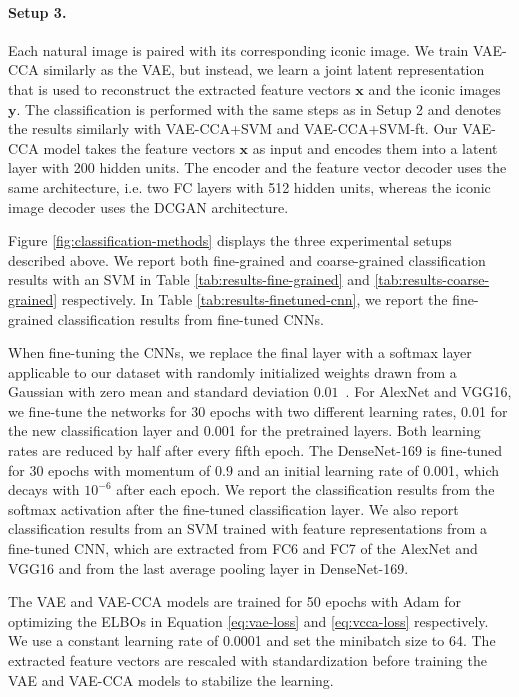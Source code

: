 \paragraph*{Setup 3.} Each natural image is paired with its corresponding iconic image. We train VAE-CCA similarly as the VAE, but instead, we learn a joint latent representation that is used to reconstruct the extracted feature vectors $\mathbf{x}$ and the iconic images $\mathbf{y}$. The classification is performed with the same steps as in Setup 2 and denotes the results similarly with VAE-CCA+SVM and VAE-CCA+SVM-ft. Our VAE-CCA model takes the feature vectors $\mathbf{x}$ as input and encodes them into a latent layer with 200 hidden units. The encoder and the feature vector decoder uses the same architecture, i.e. two FC layers with 512 hidden units, whereas the iconic image decoder uses the DCGAN  architecture.

Figure \ref{fig:classification-methods} displays the three experimental setups described above. We report both fine-grained and coarse-grained classification results with an SVM in Table \ref{tab:results-fine-grained} and \ref{tab:results-coarse-grained} respectively. In Table \ref{tab:results-finetuned-cnn}, we report the fine-grained classification results from fine-tuned CNNs.

When fine-tuning the CNNs,
we replace the final layer with a softmax layer applicable to our dataset with randomly initialized weights drawn from a Gaussian with zero mean and standard deviation $0.01$~. 
For AlexNet and VGG16, we fine-tune the networks for 30 epochs with two different learning rates, 0.01 for the new classification layer and 0.001 for the pretrained layers. Both learning rates are reduced by half after every fifth epoch. The DenseNet-169 is fine-tuned for 30 epochs with momentum of $0.9$ and an initial learning rate of 0.001, which decays with $10^{-6}$ after each epoch. We report the classification results from the softmax activation after the fine-tuned classification layer. 
We also report classification results from an SVM trained with feature representations from a fine-tuned CNN, which are extracted from FC6 and FC7 of the AlexNet and VGG16 and from the last average pooling layer in DenseNet-169.

The VAE and VAE-CCA models are trained for 50 epochs with Adam  for optimizing the ELBOs in Equation \ref{eq:vae-loss} and \ref{eq:vcca-loss} respectively. We use a constant learning rate of 0.0001 and set the minibatch size to 64. The extracted feature vectors are rescaled with standardization before training the VAE and VAE-CCA models to stabilize the learning.

